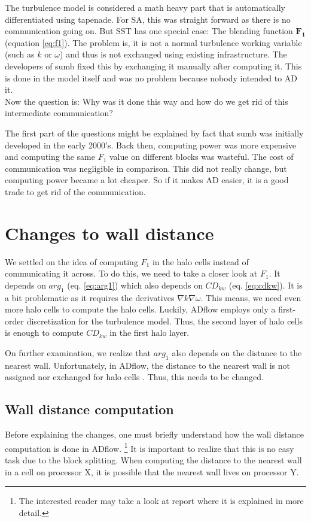 The turbulence model is considered a math heavy part that is automatically
differentiated using tapenade. For SA, this was straight forward as there is no
communication going on. But SST has one special case: The blending function
$\mathbf{F_1}$ (equation \ref{eq:f1}). The problem is, it is not a normal
turbulence working variable (such as $k$ or $\omega$) and thus is not exchanged
using existing infrastructure. The developers of sumb fixed this by exchanging
it manually after computing it. This is done in the model itself and was no
problem because nobody intended to AD it. \\

Now the question is: Why was it done this way and how do we get rid of this
intermediate communication?

The first part of the questions might be explained by fact that sumb was
initially developed in the early 2000's. Back then, computing power was more
expensive and computing the same $F_1$ value on different blocks was
wasteful. The cost of communication was negligible in comparison. This did not
really change, but computing power became a lot cheaper. So if it makes AD
easier, it is a good trade to get rid of the communication.








\section{Changes to wall distance}
We settled on the idea of computing $F_1$ in the halo cells instead of
communicating it across. To do this, we need to take a closer look at $F_1$. It
depends on $arg_1$ (eq. \ref{eq:arg1}) which also depends on $CD_{kw}$ (eq.
\ref{eq:cdkw}). \noindent It is a bit problematic as it requires the
derivatives $\nabla k \nabla \omega$. This means, we need even more halo cells
to compute the halo cells. Luckily, ADflow employs only a first-order
discretization for the turbulence model. Thus, the second layer of halo cells
is enough to compute $CD_{kw}$ in the first halo layer.

On further examination, we realize that $arg_1$ also depends on the distance to
the nearest wall. Unfortunately, in ADflow, the distance to the nearest wall is
not assigned nor exchanged for halo cells . Thus, this needs to be changed.




\subsection{Wall distance computation}
Before explaining the changes, one must briefly understand how the wall
distance computation is done in ADflow. \footnote{The interested reader may
take a look at report \cite{vt1} where it is explained in more detail.} It is
important to realize that this is no easy task due to the block splitting. When
computing the distance to the nearest wall in a cell on processor X, it is
possible that the nearest wall lives on processor Y. 

